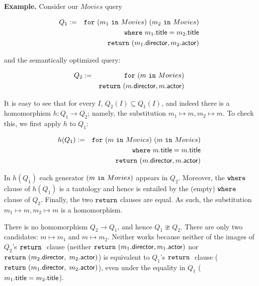 \documentclass[preprint]{sigplanconf}
\newcommand{\FOR}{{\tt for} \ }
\newcommand{\WHERE}{{\tt where} \ }
\newcommand{\IN}{ \ {\tt in} \ }
\newcommand{\RETURN}{{\tt return} \ }
\begin{document}
{\bf Example.} Consider our $Movies$ query 
\begin{normalsize}
\begin{eqnarray*}
Q_1 & := & \FOR (m_1 \IN Movies) \ (m_2 \IN Movies) \\
 & & \WHERE m_1.{\sf title} = m_2.{\sf title} \\
 & & \RETURN (m_1.{\sf director}, m_2.{\sf actor})
\end{eqnarray*}   
\end{normalsize}
and the semantically optimized query:
\begin{normalsize}
\begin{eqnarray*}
Q_2 & := & \FOR (m \IN Movies) \\
 & & \RETURN (m.{\sf director}, m.{\sf actor})
\end{eqnarray*}   
\end{normalsize}
It is easy to see that for every $I$, $Q_2(I) \subseteq Q_1(I)$, and indeed there is a homomorphism $h : Q_1 \to Q_2$; namely, the substitution $m_1 \mapsto m, m_2 \mapsto m$.  To check this, we first apply $h$ to $Q_1$:
\begin{normalsize}
\begin{eqnarray*}
h(Q_1) & := & \FOR (m \IN Movies) \ (m \IN Movies) \\
 & & \WHERE m.{\sf title} = m.{\sf title} \\
 & & \RETURN (m.{\sf director}, m.{\sf actor})
\end{eqnarray*}   
\end{normalsize}
In $h(Q_1)$ each generator $(m \IN Movies)$ appears in $Q_2$.  Moreover, the ${\tt where}$ 
clause of $h(Q_1)$ is a tautology and hence is entailed by the (empty) ${\tt where}$ clause of 
$Q_2$.  Finally, the two ${\tt return}$ clauses are equal.  As such, the substitution $m_1 
\mapsto m, m_2 \mapsto m$ is a homomorphism.  

There is no homomorphism $Q_2 \to Q_1$, and hence $Q_1 \ncong Q_2$.  
There are only two candidates: $m \mapsto m_1$ and $m \mapsto m_2$.  
Neither works because neither of the  images of $Q_2$'s $\RETURN$ clause (neither 
$\RETURN (m_1.{\sf director}, m_1.{\sf actor})$ nor $\RETURN (m_2.{\sf director},$ $m_2.
{\sf actor})$) is equivalent to $Q_1$'s $\RETURN$ clause ($\RETURN (m_1.{\sf director},$ 
$m_2.{\sf actor})$), even under the equality in $Q_1$ ($m_1.{\sf title} = m_2.{\sf 
title}$). 
\end{document}
